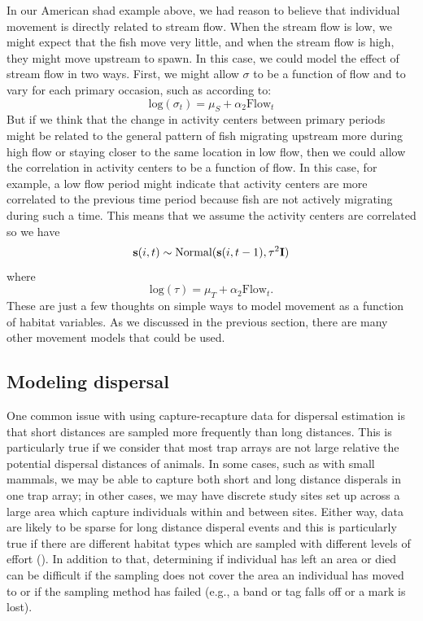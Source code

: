 In our American shad example above, we had reason to believe
that individual movement is directly related to stream flow.  When the
stream flow is low,
we might expect that the fish move very little, and when the stream
flow is high, they might
move upstream to spawn. In this case,
we could model the effect of stream flow in two ways.  First, we might allow $\sigma$
to be a function of flow and to vary for each primary occasion, such
as according to:
\[
 \mbox{log}(\sigma_t) = \mu_S + \alpha_2 \mbox{Flow}_t
\]
But if we think that the change in activity centers between primary periods might be related to the
general pattern of fish migrating upstream more during high flow or staying closer to the same location
in low flow, then we could allow the correlation in activity centers to be a function of flow.  In this
case, for example, a low flow period might indicate that activity centers are more correlated to the previous
time period because fish are not actively migrating during such a time.
This means that we assume the
activity centers are correlated so we have
\[
{\bf s}(i,t) \sim \mbox{Normal}({\bf
  s}(i,t-1), \tau^{2} {\bf I})
\]
where
\[
\mbox{log}(\tau) = \mu_T + \alpha_2 \mbox{Flow}_t.
\]
These are just a few thoughts on simple ways to model movement as a
function of habitat variables.
As we discussed in the previous section, there
are many other movement models that could be used.

\subsection{Modeling  dispersal}


One common issue with using capture-recapture data for dispersal
estimation is that short distances are sampled more frequently than
long distances.  This is particularly true if we consider that most
trap arrays are not large relative the potential dispersal distances
of animals.  In some cases, such as with small mammals, we may be able
to capture both short and long distance disperals in one trap array;
in other cases, we may have discrete study sites set up across a large
area which capture individuals within and between sites.  Either way,
data are likely to be sparse for long distance disperal events and
this is particularly true if there are different habitat types which
are sampled with different levels of effort
(\cite{ovaskainen_etal:2008}).  In addition to that, determining if
individual has left an area or died can be difficult if the sampling
does not cover the area an individual has moved to or if the sampling
method has failed (e.g., a band or tag falls off or a mark is lost).

